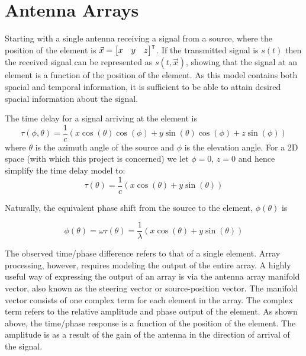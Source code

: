 \section{Antenna Arrays}

Starting with a single antenna receiving a signal from a source, where the position of the element is \(\vec{x} = \begin{bmatrix}x & y & z \end{bmatrix}^\intercal\). 
If the transmitted signal is \(s(t)\) then the received signal can be represented as \(s(t, \vec{x})\), showing that the signal at an element is a function of the position of the element.
As this model contains both spacial and temporal information, it is sufficient to be able to attain desired spacial information about the signal\cite{krim1996two}.

The time delay for a signal arriving at the element is \cite{poisel2012electronic}
\begin{equation}
 \tau(\phi, \theta)
 = \frac{1}{c} \left( x\cos(\theta)\cos(\phi) + y\sin(\theta)\cos(\phi) + z\sin(\phi) \right)
\end{equation}
where \(\theta\) is the azimuth angle of the source and \(\phi\) is the elevation angle.
For a 2D space (with which this project is concerned) we let \(\phi= 0\), \(z = 0\) and hence simplify the time delay model to:
\begin{equation}
  \tau(\theta) = \frac{1}{c} \left( x\cos(\theta) + y\sin(\theta) \right)
\end{equation}

Naturally, the equivalent phase shift from the source to the element, \(\phi(\theta)\) is

\begin{equation}
  \phi(\theta) = \omega\tau(\theta) = \frac{1}{\lambda} \left( x\cos(\theta) + y\sin(\theta) \right)
\end{equation}

The observed time/phase difference refers to that of a single element. 
Array processing, however, requires modeling the output of the entire array. 
A highly useful way of expressing the output of an array is via the antenna array manifold vector, also known as the steering vector or source-position vector. 
The manifold vector consists of one complex term for each element in the array. 
The complex term refers to the relative amplitude and phase output of the element. 
As shown above, the time/phase response is a function of the position of the element. 
The amplitude is as a result of the gain of the antenna in the direction of arrival of the signal. 

